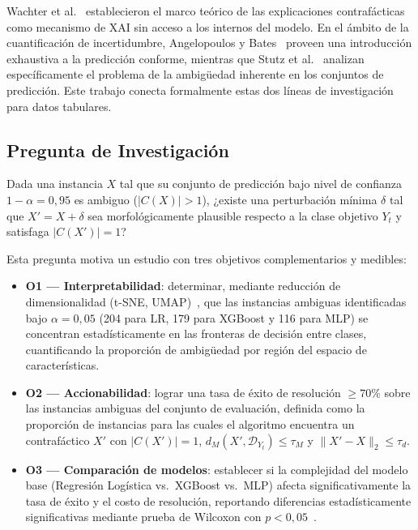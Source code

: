 \documentclass[conference]{IEEEtran}
\begin{document}
Wachter et al.~\cite{b4} establecieron el marco teórico de las
explicaciones contrafácticas como mecanismo de XAI sin acceso a los
internos del modelo. En el ámbito de la cuantificación de incertidumbre,
Angelopoulos y Bates~\cite{b2} proveen una introducción exhaustiva a la
predicción conforme, mientras que Stutz et al.~\cite{b1} analizan
específicamente el problema de la ambigüedad inherente en los conjuntos
de predicción. Este trabajo conecta formalmente estas dos líneas de
investigación para datos tabulares.

\subsection{Pregunta de Investigación}

Dada una instancia $X$ tal que su conjunto de predicción bajo nivel de
confianza $1-\alpha = 0{,}95$ es ambiguo ($|C(X)| > 1$), ¿existe una
perturbación mínima $\delta$ tal que $X' = X + \delta$ sea morfológicamente
plausible respecto a la clase objetivo $Y_t$ y satisfaga $|C(X')| = 1$?

Esta pregunta motiva un estudio con tres objetivos complementarios y medibles:
\begin{itemize}
    \item[$\bullet$] \textbf{O1 --- Interpretabilidad}: determinar, mediante
    reducción de dimensionalidad (t-SNE, UMAP)~\cite{b11,b12}, que las
    instancias ambiguas identificadas bajo $\alpha = 0{,}05$ (204 para LR,
    179 para XGBoost y 116 para MLP) se concentran estadísticamente en las
    fronteras de decisión entre clases, cuantificando la proporción de
    ambigüedad por región del espacio de características.

    \item[$\bullet$] \textbf{O2 --- Accionabilidad}: lograr una tasa de éxito
    de resolución $\geq 70\%$ sobre las instancias ambiguas del
    conjunto de evaluación, definida como la proporción de instancias para
    las cuales el algoritmo encuentra un contrafáctico $X'$ con
    $|C(X')| = 1$, $d_M(X', \mathcal{D}_{Y_t}) \leq \tau_M$ y
    $\|X' - X\|_2 \leq \tau_d$.

    \item[$\bullet$] \textbf{O3 --- Comparación de modelos}: establecer si
    la complejidad del modelo base (Regresión Logística vs.\ XGBoost vs.\
    MLP) afecta significativamente la tasa de éxito y el costo de resolución,
    reportando diferencias estadísticamente significativas mediante prueba
    de Wilcoxon con $p < 0{,}05$~\cite{b13}.
\end{itemize}
\end{document}
